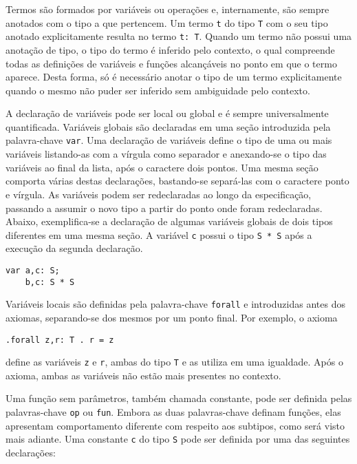 Termos são formados por variáveis ou operações e, internamente, são sempre anotados com o tipo a que pertencem.
Um termo \Verb.t. do tipo \Verb.T. com o seu tipo anotado explicitamente resulta no termo \Verb.t: T..
Quando um termo não possui uma anotação de tipo, o tipo do termo é inferido pelo contexto, o qual compreende todas as definições de variáveis e funções alcançáveis no ponto em que o termo aparece.
Desta forma, só é necessário anotar o tipo de um termo explicitamente quando o mesmo não puder ser inferido sem ambiguidade pelo contexto.

A declaração de variáveis pode ser local ou global e é sempre universalmente quantificada.
Variáveis globais são declaradas em uma seção introduzida pela palavra-chave \Verb.var..
Uma declaração de variáveis define o tipo de uma ou mais variáveis listando-as com a vírgula como separador e anexando-se o tipo das variáveis ao final da lista, após o caractere dois pontos.
Uma mesma seção comporta várias destas declarações, bastando-se separá-las com o caractere ponto e vírgula.
As variáveis podem ser redeclaradas ao longo da especificação, passando a assumir o novo tipo a partir do ponto onde foram redeclaradas.
Abaixo, exemplifica-se a declaração de algumas variáveis globais de dois tipos diferentes em uma mesma seção.
A variável \Verb.c. possui o tipo \Verb.S * S. após a execução da segunda declaração.

\begin{Verbatim}
var a,c: S;
    b,c: S * S
\end{Verbatim}

Variáveis locais são definidas pela palavra-chave \Verb.forall. e introduzidas antes dos axiomas, separando-se dos mesmos por um ponto final. Por exemplo, o axioma

\begin{Verbatim}
.forall z,r: T . r = z
\end{Verbatim}
define as variáveis \Verb.z. e \Verb.r., ambas do tipo \Verb.T. e as utiliza em uma igualdade.
Após o axioma, ambas as variáveis não estão mais presentes no contexto.

Uma função sem parâmetros, também chamada constante, pode ser definida pelas palavras-chave \Verb.op. ou \Verb.fun..
Embora as duas palavras-chave definam funções, elas apresentam comportamento diferente com respeito aos subtipos, como será visto mais adiante.
Uma constante \Verb.c. do tipo \Verb.S. pode ser definida por uma das seguintes declarações:

